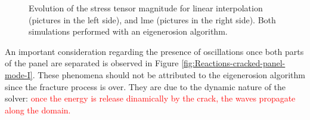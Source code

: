 \message{ !name(2020_EFM_MPM_Eigensoftening.tex)}\documentclass[preprint,12pt,a4paper]{elsarticle}
\newcommand{\PNA}[1]{
  \textcolor{red}{{#1}}
}
\begin{document}
\begin{figure}
\centering
{}
\caption{Evolution of the stress tensor magnitude for linear
  interpolation (pictures in the left side), and \acrshort{lme}
  (pictures in the right side). Both simulations performed with an
  eigenerosion algorithm.}
\label{fig:Stress-cracked-panel-mode-I}
\end{figure}
An important consideration regarding the presence of oscillations once
both parts of the panel are separated is observed in Figure
\ref{fig:Reactions-cracked-panel-mode-I}. These phenomena should not be
attributed to the eigenerosion algorithm since the fracture process is
over. They are due to the dynamic nature of the solver: \PNA{once the
  energy is release dinamically by the crack, the waves propagate
  along the domain.}
\end{document}
